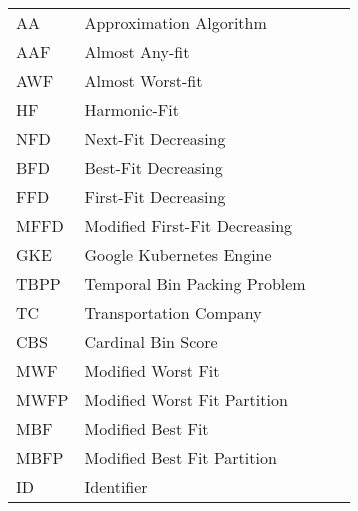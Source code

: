 \begin{flushleft}
\begin{longtable}{l p{0.8\linewidth}}
AA       & Approximation Algorithm \\
AAF      & Almost Any-fit \\
AWF      & Almost Worst-fit \\
HF       & Harmonic-Fit \\ 
NFD      & Next-Fit Decreasing \\
BFD      & Best-Fit Decreasing \\
FFD      & First-Fit Decreasing \\
MFFD     & Modified First-Fit Decreasing \\
GKE      & Google Kubernetes Engine \\
TBPP     & Temporal Bin Packing Problem \\
TC       & Transportation Company \\
CBS      & Cardinal Bin Score \\
MWF      & Modified Worst Fit \\
MWFP     & Modified Worst Fit Partition \\
MBF      & Modified Best Fit \\
MBFP     & Modified Best Fit Partition \\
ID       & Identifier \\
\end{longtable}
\end{flushleft}

